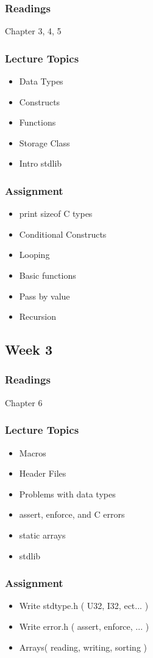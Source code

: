\documentclass[a4paper,12pt]{report}
\begin{document}
\subsubsection*{ Readings }
Chapter 3, 4, 5
\subsubsection*{Lecture Topics}
\begin{itemize}
\item Data Types 
\item Constructs
\item Functions
\item Storage Class
\item Intro stdlib
\end{itemize}
\subsubsection*{Assignment}
\begin{itemize}
\item print sizeof C types
\item Conditional Constructs
\item Looping
\item Basic functions
\item Pass by value
\item Recursion
\end{itemize}

\subsection*{Week 3}
\subsubsection*{ Readings }
Chapter 6
\subsubsection*{Lecture Topics}
\begin{itemize}
\item Macros
\item Header Files
\item Problems with data types
\item assert, enforce, and C errors
\item static arrays
\item stdlib
\end{itemize}
\subsubsection*{Assignment}
\begin{itemize}
\item Write stdtype.h ( U32, I32, ect... )
\item Write error.h ( assert, enforce, ... )
\item Arrays( reading, writing, sorting )
\end{itemize}
\end{document}
